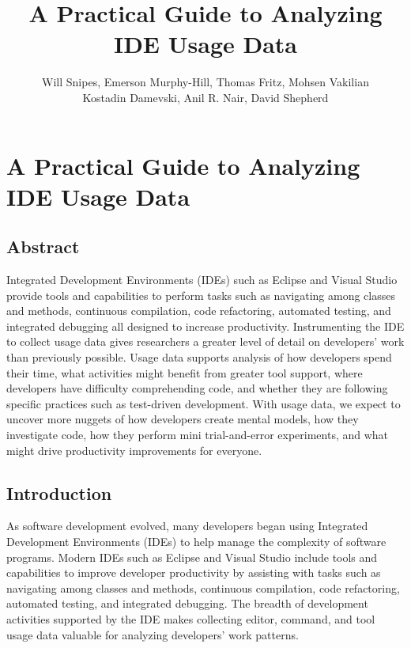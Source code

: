 \documentclass{book}
\begin{document}

\title{A Practical Guide to Analyzing IDE Usage Data\vspace{-0ex}}

\chapter{A Practical Guide to Analyzing IDE Usage Data\vspace{-0ex}}
\author{
Will Snipes, Emerson Murphy-Hill,
Thomas Fritz, Mohsen Vakilian \\
Kostadin Damevski,
Anil R. Nair, David Shepherd
}
\maketitle
\thispagestyle{empty}
\pagestyle{empty}

\begin{center}
\section*{Abstract}
\end{center}
Integrated Development Environments (IDEs) such as Eclipse and Visual Studio provide tools and capabilities to perform tasks such as navigating among classes and methods, continuous compilation, code refactoring, automated testing, and integrated debugging all designed to increase productivity.  Instrumenting the IDE to collect usage data gives researchers a greater level of detail on developers' work than previously possible.  Usage data supports analysis of how developers spend their time, what activities might benefit from greater tool support, where developers have difficulty comprehending code, and whether they are following specific practices such as test-driven development.  With usage data, we expect to uncover more nuggets of how developers create mental models, how they investigate code, how they perform mini trial-and-error experiments, and what might drive productivity improvements for everyone.

\section{Introduction}
As software development evolved, many developers began using Integrated Development Environments (IDEs) to help manage the complexity of software programs.  Modern IDEs such as Eclipse and Visual Studio include tools and capabilities to improve developer productivity by assisting with tasks such as navigating among classes and methods, continuous compilation, code refactoring, automated testing, and integrated debugging.  The breadth of development activities supported by the IDE makes collecting editor, command, and tool usage data valuable for analyzing developers' work patterns.  
\end{document}
